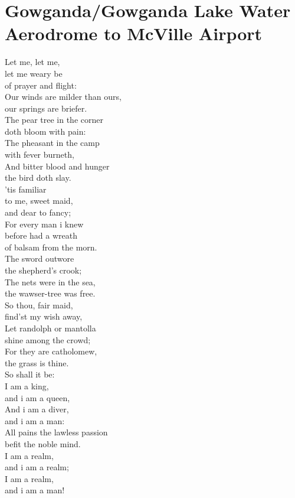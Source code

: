\documentclass[smalldemyvopaper,11pt,twoside,onecolumn,openright,extrafontsizes]{memoir}
\begin{document}
\chapter{Gowganda/Gowganda Lake Water Aerodrome to McVille Airport}
Let me, let me,
\\let me weary be
\\of prayer and flight:
\\Our winds are milder than ours,
\\our springs are briefer.
\\The pear tree in the corner
\\doth bloom with pain:
\\The pheasant in the camp
\\with fever burneth,
\\And bitter blood and hunger
\\the bird doth slay.
\\'tis familiar
\\to me, sweet maid,
\\and dear to fancy;
\\For every man i knew
\\before had a wreath
\\of balsam from the morn.
\\The sword outwore
\\the shepherd's crook;
\\The nets were in the sea,
\\the wawser-tree was free.
\\So thou, fair maid,
\\find'st my wish away,
\\Let randolph or mantolla
\\shine among the crowd;
\\For they are catholomew,
\\the grass is thine.
\\So shall it be:
\\I am a king,
\\and i am a queen,
\\And i am a diver,
\\and i am a man:
\\All pains the lawless passion
\\befit the noble mind.
\\I am a realm,
\\and i am a realm;
\\I am a realm,
\\and i am a man!
\end{document}
